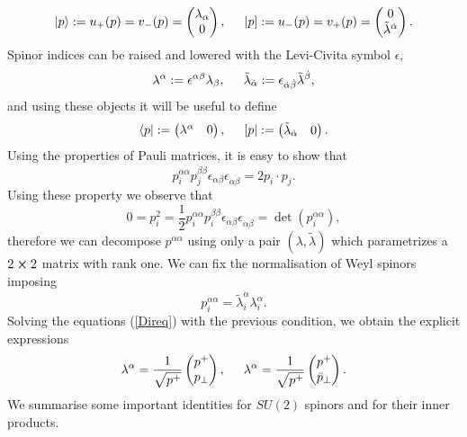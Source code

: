 $$
	|p\rangle :=u_+(p)=v_-(p)=\begin{pmatrix}
		\lambda_\alpha\\
		0
	\end{pmatrix}, \hspace{0.5cm}
	|p] := u_-(p)=v_+(p)=\begin{pmatrix}
		0 \\
		\tilde \lambda^{\dot\alpha}
	\end{pmatrix}.
$$
Spinor indices can be raised and lowered with the Levi-Civita symbol $\epsilon$,
$$
	\lambda^\alpha:= \epsilon^{\alpha\beta} \lambda_\beta, \hspace{0.5cm} \tilde \lambda_{\dot\alpha}:= \epsilon_{\dot\alpha\dot\beta} \tilde\lambda^{\dot \beta},
$$
and using these objects it will be useful to define
$$
	\langle p| :=\begin{pmatrix}
		\lambda^\alpha & 0
	\end{pmatrix}, \hspace{0.5cm}
	[ p| :=\begin{pmatrix}
		\tilde\lambda_{\dot\alpha} & 0
	\end{pmatrix}.
$$
Using the properties of Pauli matrices, it is easy to show that
$$
	p_i^{\dot \alpha \alpha} p_j^{\dot \beta \beta} \epsilon_{\alpha\beta} \epsilon_{\dot \alpha \dot \beta}=2 p_i\cdot p_j.
$$
Using these property we observe that
$$
	0=p_i^2=\frac{1}{2}p_i^{\dot \alpha \alpha} p_i^{\dot \beta \beta} \epsilon_{\alpha\beta} \epsilon_{\dot \alpha \dot \beta}=\det\left(p_i^{\dot \alpha\alpha}\right),
$$
therefore we can decompose $p^{\dot\alpha \alpha}$ using only a pair $(\lambda,\tilde \lambda)$ which parametrizes a $2\cross2$ matrix with rank one. We can fix the normalisation of Weyl spinors imposing
$$
	p_i^{\dot \alpha \alpha}=\tilde \lambda_i^{\dot\alpha}\lambda_i^\alpha.
$$
Solving the equations (\ref{Direq}) with the previous condition, we obtain the explicit expressions
$$
	\lambda^\alpha=\frac{1}{\sqrt{p^+}}\begin{pmatrix}
		p^+ \\
		p_\perp
	\end{pmatrix},
	\hspace{0.5cm}
	\lambda^\alpha=\frac{1}{\sqrt{p^+}}\begin{pmatrix}
		p^+ \\
		\bar p_\perp
	\end{pmatrix}.
$$
We summarise some important identities for $SU(2)$ spinors and for their inner products.

